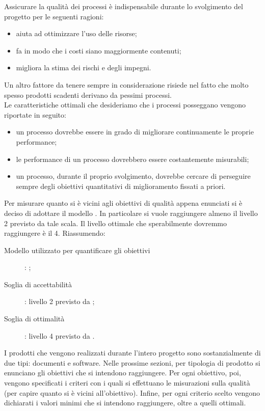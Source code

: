 		  \label{subsec:obiettiviprocesso}
			Assicurare la qualità dei processi è indispensabile durante lo svolgimento del progetto per le seguenti ragioni:
			\begin{itemize}
				\item aiuta ad ottimizzare l'uso delle risorse;
				\item fa in modo che i costi siano maggiormente contenuti;
				\item migliora la stima dei rischi e degli impegni.
			\end{itemize}
			Un altro fattore da tenere sempre in considerazione risiede nel fatto che molto spesso prodotti scadenti derivano da pessimi processi.\\
			Le caratteristiche ottimali che desideriamo che i processi posseggano vengono riportate in seguito:
			\begin{itemize}
				\item un processo dovrebbe essere in grado di migliorare continuamente le proprie performance;
				\item le performance di un processo dovrebbero essere costantemente misurabili;
				\item un processo, durante il proprio svolgimento, dovrebbe cercare di perseguire sempre degli obiettivi quantitativi di miglioramento fissati a priori.
			\end{itemize}
			Per misurare quanto si è vicini agli obiettivi di qualità appena enunciati si è deciso di adottare il modello . In particolare si vuole raggiungere almeno il livello 2 previsto da tale scala. Il livello ottimale che sperabilmente dovremmo raggiungere è il 4. Riassumendo:
			\begin{description}
				\item[Modello utilizzato per quantificare gli obiettivi]: ;
				\item[Soglia di accettabilità]: livello 2 previsto da ;
				\item[Soglia di ottimalità]: livello 4 previsto da .
			\end{description}

		  \label{subsec:obiettiviprodotto}
			I prodotti che vengono realizzati durante l'intero progetto sono sostanzialmente di due tipi: documenti e software. Nelle prossime sezioni, per tipologia di prodotto si enunciano gli obiettivi che si intendono raggiungere. Per ogni obiettivo, poi, vengono specificati i criteri con i quali si effettuano le misurazioni sulla qualità (per capire quanto si è vicini all'obiettivo). Infine, per ogni criterio scelto vengono dichiarati i valori minimi che si intendono raggiungere, oltre a quelli ottimali.

